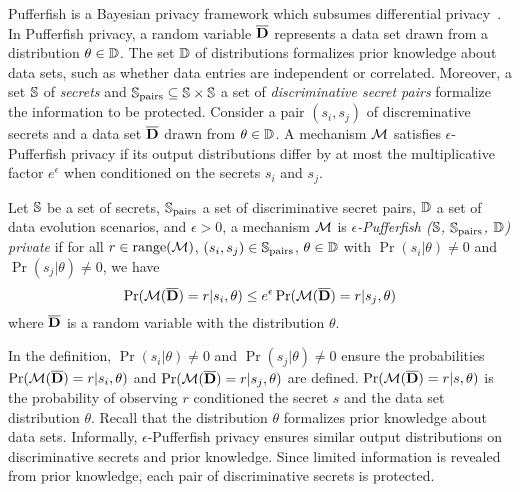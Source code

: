Pufferfish is a Bayesian privacy framework which subsumes differential
privacy~\cite{KM:14:PFMPD}. In Pufferfish privacy, a random variable
$\overline{\mathbf{D}}$ represents a data set drawn from a distribution $\theta \in
\mathbb{D}$. The set $\mathbb{D}$ of distributions formalizes prior knowledge
about data sets, such as whether data entries are independent or
correlated. Moreover, a set $\mathbb{S}$ of \emph{secrets} and
$\mathbb{S}_{\textmd{pairs}} \subseteq \mathbb{S} \times \mathbb{S}$ a set of
\emph{discriminative secret pairs} formalize the information to be
protected. Consider a pair $(s_i, s_j)$ of discreminative secrets and
a data set $\overline{\mathbf{D}}$ drawn from $\theta \in \mathbb{D}$. A mechanism $\mathcal{M}$
satisfies $\epsilon$-Pufferfish privacy if its output distributions
differ by at most the multiplicative factor $e^{\epsilon}$ when
conditioned on the secrets $s_i$ and $s_j$.

\begin{definition}
  Let $\mathbb{S}$ be a set of secrets, $\mathbb{S}_{\textmd{pairs}}$ a set of
  discriminative secret pairs, $\mathbb{D}$ a set of data evolution
  scenarios, and $\epsilon > 0$, a mechanism $\mathcal{M}$ is
  \emph{$\epsilon$-Pufferfish ($\mathbb{S}$, $\mathbb{S}_{\textmd{pairs}}$,
    $\mathbb{D}$) private} if for all $r \in \textmd{range}(\mathcal{M})$, $(s_i, s_j) \in
    \mathbb{S}_{\textmd{pairs}}$, $\theta \in \mathbb{D}$ with $\Pr (s_i |
    \theta) \neq 0$ and $\Pr (s_j | \theta) \neq 0$, we have
    \[
      \Pr (\mathcal{M} (\overline{\mathbf{D}}) = r | s_i, \theta) \leq
      e^\epsilon \Pr (\mathcal{M} (\overline{\mathbf{D}}) = r | s_j, \theta)
    \]
    where $\overline{\mathbf{D}}$ is a random variable with the distribution $\theta$.
\end{definition}

In the definition, $\Pr (s_i | \theta) \neq 0$ and $\Pr (s_j | \theta)
\neq 0$ ensure the probabilities $\Pr (\mathcal{M} (\overline{\mathbf{D}}) = r | s_i, \theta)$
and $\Pr (\mathcal{M} (\overline{\mathbf{D}}) = r | s_j, \theta)$ are defined. 
$\Pr (\mathcal{M} (\overline{\mathbf{D}}) = r | s, \theta)$ is the probability of observing
$r$ conditioned the secret $s$ and the data set distribution $\theta$.
Recall that the distribution $\theta$ formalizes prior knowledge about
data sets. Informally, $\epsilon$-Pufferfish privacy ensures similar
output distributions on discriminative secrets and prior knowledge. 
Since limited information is revealed from prior knowledge, each pair
of discriminative secrets is protected.
  